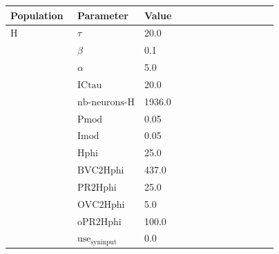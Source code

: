 \documentclass{article}
\begin{document}
\noindent
\begin{tabularx}{\linewidth}{|p{0.25\linewidth}|p{0.25\linewidth}|X|}\hline
\textbf{Population} & \textbf{Parameter} & \textbf{Value}   \\ \hline

    H             & $\tau$        & 20.0  \\ \hline

                 & $\beta$        & 0.1  \\ \hline

                 & $\alpha$        & 5.0  \\ \hline

                 & ${\text{ICtau}}$        & 20.0  \\ \hline

                 & ${\text{nb-neurons-H}}$        & 1936.0  \\ \hline

                 & ${\text{Pmod}}$        & 0.05  \\ \hline

                 & ${\text{Imod}}$        & 0.05  \\ \hline

                 & ${\text{Hphi}}$        & 25.0  \\ \hline

                 & ${\text{BVC2Hphi}}$        & 437.0  \\ \hline

                 & ${\text{PR2Hphi}}$        & 25.0  \\ \hline

                 & ${\text{OVC2Hphi}}$        & 5.0  \\ \hline

                 & ${\text{oPR2Hphi}}$        & 100.0  \\ \hline

                 & ${\text{use}}_{\text{syninput}}$        & 0.0  \\ \hline

\end{tabularx}

\vspace{2ex}
\end{document}
